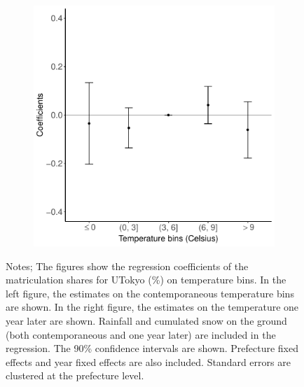 \documentclass[10pt, pdfmx,hiresbb]{beamer}
\begin{document}
\begin{frame}
\begin{figure}
\begin{minipage}{0.49\textwidth}
\begin{figure}[h]
        \includegraphics[width = \textwidth]{../Output/images/reg_placebo_f1_4.pdf}
        \centering
      \end{figure}
    \end{minipage}
    \tiny
    \begin{tablenotes}
    \item Notes;
      The figures show the regression coefficients of the matriculation shares for UTokyo (\%) on temperature bins.
      In the left figure, the estimates on the contemporaneous temperature bins are shown.
      In the right figure, the estimates on the temperature one year later are shown.
      Rainfall and cumulated snow on the ground (both contemporaneous and one year later) are included in the regression.
      The 90\% confidence intervals are shown.
      Prefecture fixed effects and year fixed effects are also included.
      Standard errors are clustered at the prefecture level.
    \end{tablenotes}
  \end{figure}
\end{frame}
\end{document}
